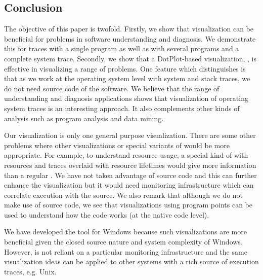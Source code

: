 \subsection{Conclusion}
\label{sec:conclusion}

The objective of this paper is twofold.
Firstly, we show that visualization can be beneficial for problems
in software understanding and diagnosis. We demonstrate this
for traces with a single program as well as with
several programs and a complete system trace.
Secondly, we show that a DotPlot-based visualization, \VDP{}, is effective
in visualizing a range of problems.
One feature which distinguishes \lviz{} is that as we work
at the operating system level with system and stack traces, 
we do not need source code of the software.
We believe that the range of understanding and diagnosis applications
shows that visualization of operating system traces is an interesting approach.
It also complements other kinds of analysis such
as program analysis and data mining.

Our \VDP{} visualization is only one general purpose visualization.
There are some other problems where other visualizations \cite{dep-icse} or special
variants of \VDP{} would be more appropriate. For example, to understand
resource usage, a special kind of \VDP{} with resources and traces overlaid
with resource lifetimes would give more information than a regular \VDP{}.
We have not taken advantage of source code and this can further enhance
the visualization but it would need monitoring infrastructure which
can correlate execution with the source.
We also remark that although we do not make use of source code, we
see that visualizations using program points can be used to understand 
how the code works (at the native code level).

We have developed the \VDP{} tool for Windows because such visualizations
are more beneficial given the closed source nature and system complexity
of Windows. 
However, \VDP{} is not reliant on a particular monitoring 
infrastructure and the same visualization ideas can be applied
to other systems with a rich source of execution traces, e.g. Unix.
